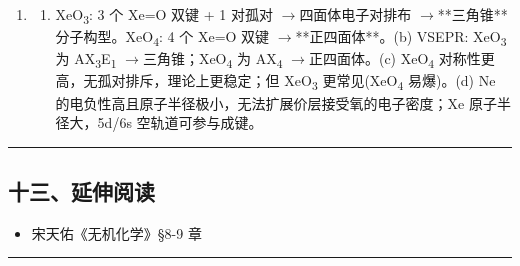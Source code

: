 \documentclass[a4paper,11pt]{ctexart}
\providecommand{\tightlist}{\setlength{\itemsep}{0pt}\setlength{\parskip}{0pt}}
\newcommand{\箭}{\ensuremath{\rightarrow}}
\newcommand{\左箭}{\ensuremath{\leftarrow}}
\newcommand{\上箭}{\ensuremath{\uparrow}}
\newcommand{\下箭}{\ensuremath{\downarrow}}
\newcommand{\衡}{\ensuremath{\rightleftharpoons}}
\newcommand{\双箭}{\ensuremath{\leftrightarrow}}
\newcommand{\约等于}{\ensuremath{\approx}}
\newcommand{\小于等于}{\ensuremath{\leq}}
\newcommand{\大于等于}{\ensuremath{\geq}}
\newcommand{\不等于}{\ensuremath{\neq}}
\newcommand{\西格马}{\ensuremath{\sigma}}
\newcommand{\派}{\ensuremath{\pi}}
\begin{document}
\begin{enumerate}
\item
  \begin{enumerate}
  \def\labelenumii{(\alph{enumii})}
  \tightlist
  \item
    XeO\textsubscript{3}: 3 个 Xe=O 双键 + 1 对孤对 \箭 四面体电子对排布 \箭 **三角锥**分子构型。XeO\textsubscript{4}: 4 个 Xe=O 双键 \箭 **正四面体**。(b) VSEPR: XeO\textsubscript{3} 为 AX\textsubscript{3}E\textsubscript{1} \箭 三角锥；XeO\textsubscript{4} 为 AX\textsubscript{4} \箭 正四面体。(c) XeO\textsubscript{4} 对称性更高，无孤对排斥，理论上更稳定；但 XeO\textsubscript{3} 更常见(XeO\textsubscript{4} 易爆)。(d) Ne 的电负性高且原子半径极小，无法扩展价层接受氧的电子密度；Xe 原子半径大，5d/6s 空轨道可参与成键。
  \end{enumerate}
\end{enumerate}

\begin{center}\rule{0.5\linewidth}{0.5pt}\end{center}

\subsection{十三、延伸阅读}\label{ux5341ux4e09ux5ef6ux4f38ux9605ux8bfb}

\begin{itemize}
\tightlist
\item
  宋天佑《无机化学》§8-9 章
\end{itemize}

\begin{center}\rule{0.5\linewidth}{0.5pt}\end{center}
\end{document}
